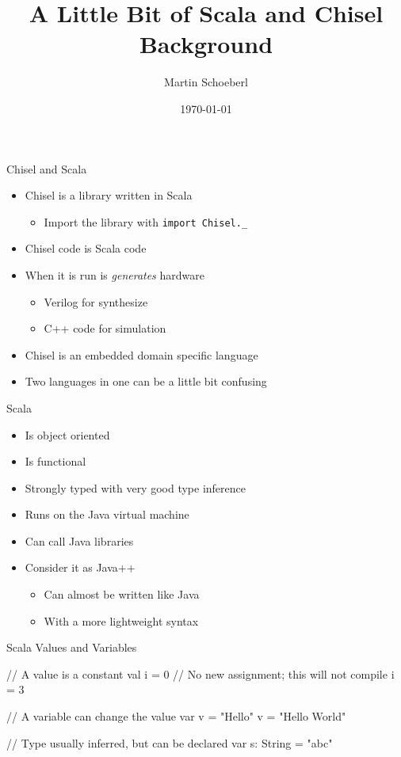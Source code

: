 \documentclass[xcolor=pdflatex,dvipsnames,table]{beamer}
\title{A Little Bit of Scala and Chisel Background}
\author{Martin Schoeberl}
\date{\today}
\institute{Technical University of Denmark}
\newcommand{\code}[1]{{\texttt{#1}}}
\begin{document}
\begin{frame}
\titlepage
\end{frame}

\begin{frame}[fragile]{Chisel and Scala}
\begin{itemize}
\item Chisel is a library written in Scala
\begin{itemize}
\item Import the library with \code{import Chisel.\_}
\end{itemize}
\item Chisel code is Scala code
\item When it is run is \emph{generates} hardware
\begin{itemize}
\item Verilog for synthesize
\item C++ code for simulation
\end{itemize}
\item Chisel is an embedded domain specific language
\item Two languages in one can be a little bit confusing
\end{itemize}
\end{frame}

\begin{frame}[fragile]{Scala}
\begin{itemize}
\item Is object oriented
\item Is functional
\item Strongly typed with very good type inference
\item Runs on the Java virtual machine
\item Can call Java libraries
\item Consider it as Java++
\begin{itemize}
\item Can almost be written like Java
\item With a more lightweight syntax
\end{itemize}
\end{itemize}
\end{frame}

\begin{frame}[fragile]{Scala Values and Variables}
\begin{chisel}
// A value is a constant
val i = 0
// No new assignment; this will not compile
i = 3

// A variable can change the value
var v = "Hello"
v = "Hello World"

// Type usually inferred, but can be declared
var s: String = "abc"
\end{chisel}
\end{frame}
\end{document}
